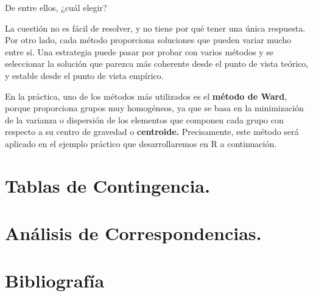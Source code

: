 \documentclass[
]{book}
\begin{document}
De entre ellos, ¿cuál elegir?

La cuestión no es fácil de resolver, y no tiene por qué tener una única respuesta. Por otro lado, cada método proporciona soluciones que pueden variar mucho entre sí. Una estrategia puede pasar por probar con varios métodos y se seleccionar la solución que parezca más coherente desde el punto de vista teórico, y estable desde el punto de vista empírico.

En la práctica, uno de los métodos más utilizados es el \textbf{método de Ward}, porque proporciona grupos muy homogéneos, ya que se basa en la minimización de la varianza o dispersión de los elementos que componen cada grupo con respecto a su centro de gravedad o \textbf{centroide.} Precisamente, este método será aplicado en el ejemplo práctico que desarrollaremos en R a continuación.

\chapter{Tablas de Contingencia.}\label{tablas-de-contingencia.}

\chapter{Análisis de Correspondencias.}\label{anuxe1lisis-de-correspondencias.}

\chapter*{Bibliografía}\label{bibliografuxeda}
\end{document}
